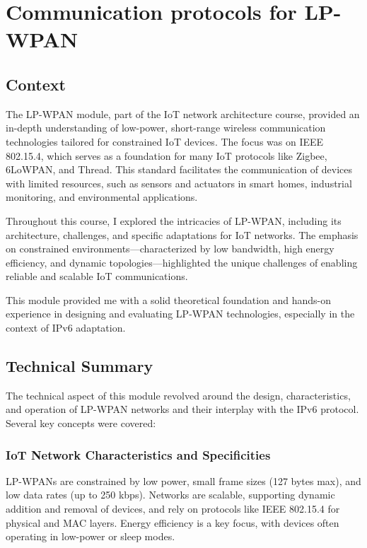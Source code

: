 \section{Communication protocols for LP-WPAN}
\subsection{Context}

\indent \indent The LP-WPAN module, part of the IoT network architecture course, provided an in-depth understanding of low-power, short-range wireless communication technologies tailored for constrained IoT devices.
The focus was on IEEE 802.15.4, which serves as a foundation for many IoT protocols like Zigbee, 6LoWPAN, and Thread.
This standard facilitates the communication of devices with limited resources, such as sensors and actuators in smart homes, industrial monitoring, and environmental applications.

\vspace{0.25cm}
\indent Throughout this course, I explored the intricacies of LP-WPAN, including its architecture, challenges, and specific adaptations for IoT networks.
The emphasis on constrained environments—characterized by low bandwidth, high energy efficiency, and dynamic topologies—highlighted the unique challenges of enabling reliable and scalable IoT communications.

\vspace{0.25cm}
\indent This module provided me with a solid theoretical foundation and hands-on experience in designing and evaluating LP-WPAN technologies, especially in the context of IPv6 adaptation.

\subsection{Technical Summary}
\indent \indent The technical aspect of this module revolved around the design, characteristics, and operation of LP-WPAN networks and their interplay with the IPv6 protocol.
Several key concepts were covered:

\subsubsection{IoT Network Characteristics and Specificities}
\indent \indent LP-WPANs are constrained by low power, small frame sizes (127 bytes max), and low data rates (up to 250 kbps).
Networks are scalable, supporting dynamic addition and removal of devices, and rely on protocols like IEEE 802.15.4 for physical and MAC layers.
Energy efficiency is a key focus, with devices often operating in low-power or sleep modes.

